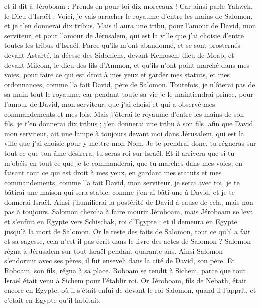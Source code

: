 \begin{multicols}{2}
et il dit à Jéroboam : Prends-en pour toi dix morceaux ! Car ainsi parle Yahweh, le Dieu d'Israël : Voici, je vais arracher le royaume d'entre les mains de Salomon, et je t'en donnerai dix tribus.
Mais il aura une tribu, pour l'amour de David, mon serviteur, et pour l'amour de Jérusalem, qui est la ville que j'ai choisie d'entre toutes les tribus d'Israël.
Parce qu'ils m'ont abandonné, et se sont prosternés devant Astarté, la déesse des Sidoniens, devant Kemosch, dieu de Moab, et devant Milcom, le dieu des fils d'Ammon, et qu'ils n'ont point marché dans mes voies, pour faire ce qui est droit à mes yeux et garder mes statuts, et mes ordonnances, comme l'a fait David, père de Salomon.
Toutefois, je n'ôterai pas de sa main tout le royaume, car pendant toute sa vie je le maintiendrai prince, pour l'amour de David, mon serviteur, que j'ai choisi et qui a observé mes commandements et mes lois.
Mais j'ôterai le royaume d'entre les mains de son fils, je t'en donnerai dix tribus ;
j'en donnerai une tribu à son fils, afin que David, mon serviteur, ait une lampe à toujours devant moi dans Jérusalem, qui est la ville que j'ai choisie pour y mettre mon Nom.
Je te prendrai donc, tu régneras sur tout ce que ton âme désirera, tu seras roi sur Israël.
Et il arrivera que si tu m'obéis en tout ce que je te commanderai, que tu marches dans mes voies, en faisant tout ce qui est droit à mes yeux, en gardant mes statuts et mes commandements, comme l'a fait David, mon serviteur, je serai avec toi, je te bâtirai une maison qui sera stable, comme j'en ai bâti une à David, et je te donnerai Israël.
Ainsi j'humilierai la postérité de David à cause de cela, mais non pas à toujours.
Salomon chercha à faire mourir Jéroboam, mais Jéroboam se leva et s'enfuit en Egypte vers Schischak, roi d'Egypte ; et il demeura en Egypte jusqu'à la mort de Salomon.
Or le reste des faits de Salomon, tout ce qu'il a fait et sa sagesse, cela n'est-il pas écrit dans le livre des actes de Salomon ?
Salomon régna à Jérusalem sur tout Israël pendant quarante ans.
Ainsi Salomon s'endormit avec ses pères, il fut enseveli dans la cité de David, son père. Et Roboam, son fils, régna à sa place.
\VerseOne{}Roboam se rendit à Sichem, parce que tout Israël était venu à Sichem pour l'établir roi.
Or Jéroboam, fils de Nebath, était encore en Egypte, où il s'était enfui de devant le roi Salomon, quand il l'apprit, et c'était en Egypte qu'il habitait.

\end{multicols}
